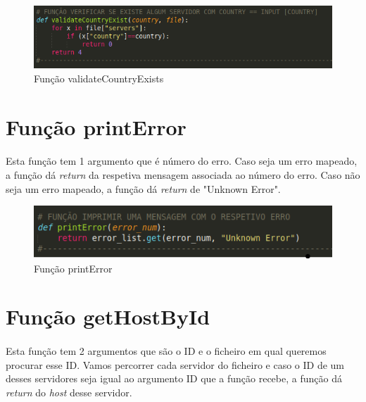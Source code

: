 \documentclass{report}
\begin{document}
\begin{figure}[H]
\centering
\includegraphics[width=1.1\linewidth]{valCountry.png}
\caption{Função validateCountryExists}
\label{valCount}
\end{figure}


\section{Função printError }
\label{sec:printError}
\paragraph{}
Esta função tem 1 argumento que é número do erro. Caso seja um erro mapeado, a função dá \textit{return} da respetiva mensagem associada ao número do erro.\newline
Caso não seja um erro mapeado, a função dá \textit{return} de "Unknown Error".

\begin{figure}[H]
\centering
\includegraphics[width=1.1\linewidth]{printError.png}
\caption{Função printError}
\label{print}
\end{figure}

\paragraph{}

\section{Função getHostById }
\label{sec:getHostById}
\paragraph{}
Esta função tem 2 argumentos que são o ID e o ficheiro em qual queremos procurar esse ID.
Vamos percorrer cada servidor do ficheiro e caso o ID de um desses servidores seja igual ao argumento ID que a função recebe, a função dá \textit{return} do \textit{host} desse servidor.
\end{document}
